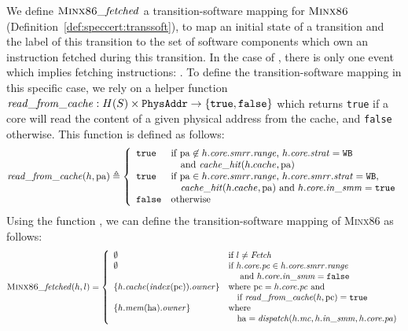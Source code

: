 We define \(\textsc{Minx86}\mathit{\_fetched}\) a transition-software mapping for
$\textsc{Minx86}$ (Definition~\ref{def:speccert:transsoft}), to map an
initial state of a transition and the label of this transition to the set of
software components which own an instruction fetched during this transition.
%
In the case of , there is only one event which implies
fetching instructions: .
%
To define the transition-software mapping in this specific case, we rely on a
helper function
\( \mathit{read\_from\_cache} : H(S) \times \texttt{PhysAddr} \rightarrow \{
\texttt{true}, \texttt{false} \} \) which returns \texttt{true} if a core will
read the content of a given physical address from the cache, and \texttt{false}
otherwise.
%
This function is defined as follows:
%
\[
  \mathit{read\_from\_cache}(h, \mathrm{pa}) \triangleq \left\{
    \begin{array}{ll}
      \texttt{true} & \text{if }\mathrm{pa} \not\in
                      h.\mathit{core}.\mathit{smrr}.\mathit{range}\text{, }
                      h.\mathit{core}.\mathit{strat} = \texttt{WB} \\
                    & \quad\text{and } \mathit{cache\_hit}(h.cache, \mathrm{pa}) \\
      \texttt{true} & \text{if }\mathrm{pa} \in
                      h.\mathit{core}.\mathit{smrr}.\mathit{range}\text{, }
                      h.\mathit{core}.\mathit{smrr}.\mathit{strat} = \texttt{WB}, \\
                    & \quad \mathit{cache\_hit}(h.cache, \mathrm{pa}) \text{ and } h.\mathit{core}.\mathit{in\_smm} =
                      \texttt{true} \\
      \texttt{false} & \text{otherwise}
    \end{array}
  \right.
\]
%
Using the function , we can define the
transition-software mapping of {\scshape Minx86} as follows:
%
\[
  \textsc{Minx86}\mathit{\_fetched}(h, l) = \left\{
    \begin{array}{ll}
      \emptyset & \text{if } l \neq \mathit{Fetch} \\
      \emptyset & \text{if } h.\mathit{core}.\mathit{pc} \in
                  h.\mathit{core}.\mathit{smrr}.\mathit{range} \\
                & \quad \text{ and }
                  h.\mathit{core}.\mathit{in\_smm} = \texttt{false} \\
      \{ h.\mathit{cache}(\mathit{index}(\mathrm{pc})).\mathit{owner} \} & \text{where }
                                                                  \mathrm{pc} =
                                                                  h.\mathit{core}.\mathit{pc}
                                                                  \text{ and} \\
                & \quad\text{if }\mathit{read\_from\_cache}(h, \mathrm{pc})
                  = \texttt{true} \\
      \{ h.\mathit{mem}(\mathrm{ha}).\mathit{owner} \} & \text{where } \\
                & \quad\mathrm{ha} =
                  \mathit{dispatch}(h.\mathit{mc},
                  h.\mathit{in\_smm}, h.\mathit{core}.\mathit{pa})

    \end{array}
  \right.
\]
